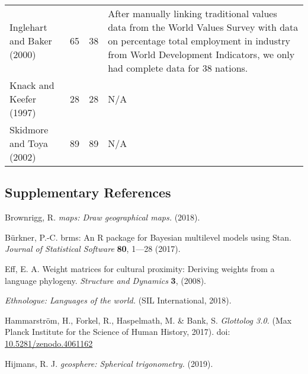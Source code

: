 \documentclass[
  man,floatsintext]{apa6}
\begin{document}
\begin{center}
\begin{ThreePartTable}
{\begin{longtable}{m{4cm}m{2cm}m{2cm}m{7cm}}
Inglehart and Baker (2000) & 65 & 38 & After manually linking traditional values data from the World Values Survey with data on percentage total employment in industry from World Development Indicators, we only had complete data for 38 nations.\\
Knack and Keefer (1997) & 28 & 28 & N/A\\
Skidmore and Toya (2002) & 89 & 89 & N/A\\
\bottomrule
\end{longtable}

}

\end{ThreePartTable}
\end{center}

\newpage

\hypertarget{supplementary-references}{%
\subsection{Supplementary References}\label{supplementary-references}}

Brownrigg, R. \emph{maps: Draw geographical maps.} (2018).

Bürkner, P.-C. brms: An R package for Bayesian multilevel models using Stan. \emph{Journal of Statistical Software} \textbf{80}, 1---28 (2017).

Eff, E. A. Weight matrices for cultural proximity: Deriving weights from a language phylogeny. \emph{Structure and Dynamics} \textbf{3}, (2008).

\emph{Ethnologue: Languages of the world.} (SIL International, 2018).

Hammarström, H., Forkel, R., Haspelmath, M. \& Bank, S. \emph{Glottolog 3.0.} (Max Planck Institute for the Science of Human History, 2017). doi: \href{https://doi.org/10.5281/zenodo.4061162}{10.5281/zenodo.4061162}

Hijmans, R. J. \emph{geosphere: Spherical trigonometry.} (2019).
\end{document}
